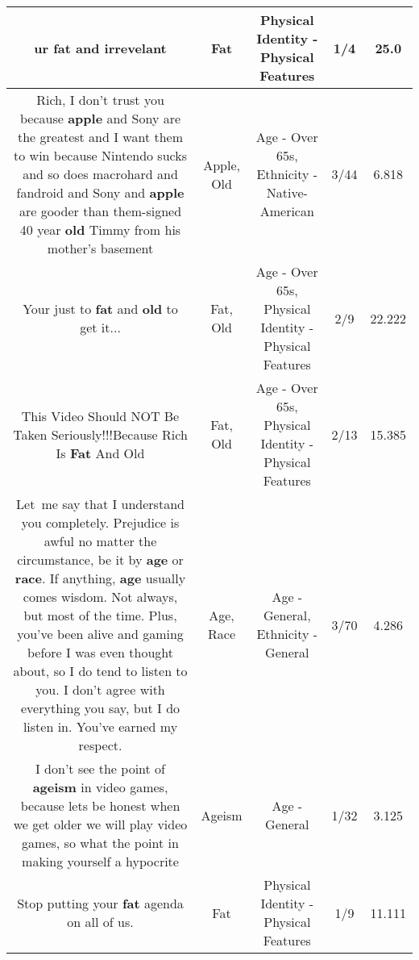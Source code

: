 \documentclass[11pt]{article}
\newlength\mylength
\begin{document}
\begin{center}
\begin{longtable}{|C{.65\mylength}|C{.30\mylength}|C{.12\mylength}|C{.12\mylength}|C{.12\mylength}|}
  \small ur \textbf{fat} and irrevelant\normalsize   & Fat & Physical Identity - Physical Features & 1/4 & 25.0 \\  \hline
  \small Rich, I don't trust you because \textbf{apple} and Sony are the greatest and I want them to win because Nintendo sucks and so does macrohard and fandroid and Sony and \textbf{apple} are gooder than them-signed 40 year \textbf{old} Timmy from his mother's basement\normalsize   & Apple, Old & Age - Over 65s, Ethnicity - Native-American & 3/44 & 6.818 \\  \hline
  \small Your just to \textbf{fat} and \textbf{old} to get it...\normalsize   & Fat, Old & Age - Over 65s, Physical Identity - Physical Features & 2/9 & 22.222 \\  \hline
  \small This Video Should NOT Be Taken Seriously!!!Because Rich Is \textbf{Fat} And Old\normalsize   & Fat, Old & Age - Over 65s, Physical Identity - Physical Features & 2/13 & 15.385 \\  \hline
  \small Let me say that I understand you completely. Prejudice is awful no matter the circumstance, be it by \textbf{age} or \textbf{race}. If anything, \textbf{age} usually comes wisdom. Not always, but most of the time. Plus, you've been alive and gaming before I was even thought about, so I do tend to listen to you. I don't agree with everything you say, but I do listen in. You've earned my respect.\normalsize   & Age, Race & Age - General, Ethnicity - General & 3/70 & 4.286 \\  \hline
  \small I don't see the point of \textbf{ageism} in video games, because lets be honest when we get older we will play video games, so what the point in making yourself a hypocrite\normalsize   & Ageism & Age - General & 1/32 & 3.125 \\  \hline
  \small Stop putting your \textbf{fat} agenda on all of us.\normalsize   & Fat & Physical Identity - Physical Features & 1/9 & 11.111 \\  \hline

\end{longtable}
\end{center}
\end{document}
